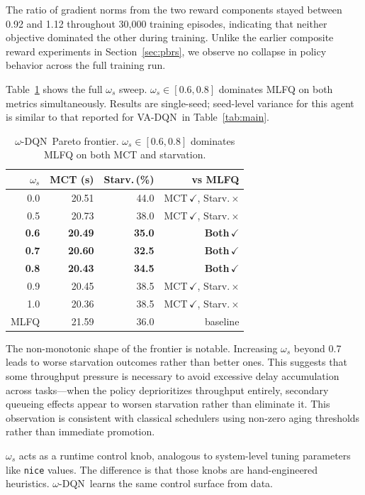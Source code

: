 \documentclass[10pt,twocolumn]{article}
\theoremstyle{remark}
\newcommand{\vadqn}{VA-DQN}
\newcommand{\omegadqn}{$\omega$-DQN}
\begin{document}
The ratio of gradient norms from the two reward components stayed
between 0.92 and 1.12 throughout 30,000 training episodes,
indicating that neither objective dominated the other during
training. Unlike the earlier composite reward experiments in
Section~\ref{sec:pbrs}, we observe no collapse in policy behavior
across the full training run.

Table~\ref{tab:omega} shows the full $\omega_s$ sweep.
$\omega_s\in[0.6, 0.8]$ dominates MLFQ on both metrics
simultaneously. Results are single-seed; seed-level variance for
this agent is similar to that reported for \vadqn\ in
Table~\ref{tab:main}.

\begin{table}[h]
\centering
\caption{\omegadqn\ Pareto frontier.
$\omega_s\in[0.6,0.8]$ dominates MLFQ on both MCT and starvation.}
\label{tab:omega}
\small
\begin{tabular}{rrrr}
\toprule
$\omega_s$ & MCT (s) & Starv.\,(\%) & vs MLFQ \\
\midrule
0.0 & 20.51 & 44.0 & MCT\,$\checkmark$, Starv.\,$\times$ \\
0.5 & 20.73 & 38.0 & MCT\,$\checkmark$, Starv.\,$\times$ \\
\textbf{0.6} & \textbf{20.49} & \textbf{35.0} & \textbf{Both\,$\checkmark$} \\
\textbf{0.7} & \textbf{20.60} & \textbf{32.5} & \textbf{Both\,$\checkmark$} \\
\textbf{0.8} & \textbf{20.43} & \textbf{34.5} & \textbf{Both\,$\checkmark$} \\
0.9 & 20.45 & 38.5 & MCT\,$\checkmark$, Starv.\,$\times$ \\
1.0 & 20.36 & 38.5 & MCT\,$\checkmark$, Starv.\,$\times$ \\
\midrule
MLFQ & 21.59 & 36.0 & baseline \\
\bottomrule
\end{tabular}
\end{table}

The non-monotonic shape of the frontier is notable. Increasing
$\omega_s$ beyond 0.7 leads to worse starvation outcomes rather than
better ones. This suggests that some throughput pressure is necessary
to avoid excessive delay accumulation across tasks---when the policy
deprioritizes throughput entirely, secondary queueing effects appear
to worsen starvation rather than eliminate it. This observation is
consistent with classical schedulers using non-zero aging thresholds
rather than immediate promotion.

$\omega_s$ acts as a runtime control knob, analogous to system-level
tuning parameters like \texttt{nice} values. The difference is that
those knobs are hand-engineered heuristics. \omegadqn\ learns the
same control surface from data.
\end{document}
